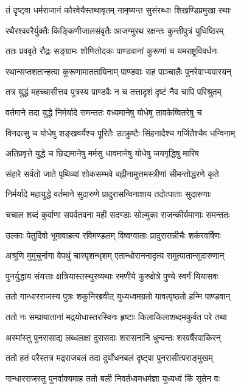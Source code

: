 \twolineshloka
{तं दृष्ट्वा धर्मराजानं कौरवेयैस्तथावृतम्}
{नामृष्यन्त सुसंरब्धाः शिखण्डिप्रमुखा रथाः}


\twolineshloka
{रथैरश्ववरैर्युक्तैः किङ्किणीजालसंवृतैः}
{आजग्मुरथ रक्षन्तः कुन्तीपुत्रं युधिष्ठिरम्}


\twolineshloka
{ततः प्रववृते रौद्रः सङ्ग्रामः शोणितोदकः}
{पाण्डवानां कुरूणां च यमराष्ट्रविवर्धनः}


\twolineshloka
{रथान्सप्तशतान्हत्वा कुरूणामाततायिनाम्}
{पाण्डवाः सह पाञ्चालैः पुनरेवाभ्यवारयन्}


\twolineshloka
{तत्र युद्धं महच्चासीत्तव पुत्रस्य पाण्डवैः}
{न च तत्तादृशं दृष्टं नैव चापि परिश्रुतम्}


\twolineshloka
{वर्तमाने तदा युद्धे निर्मर्यादे समन्ततः}
{वध्यमानेषु योधेषु तावकेष्वितरेषु च}


\twolineshloka
{विनदत्सु च योधेषु शङ्खवर्यैश्च पूरितैः}
{उत्क्रुष्टैः सिंहनादैश्च गर्जितैश्चैव धन्विनाम्}


\twolineshloka
{अतिप्रवृत्ते युद्धे च छिद्यमानेषु मर्मसु}
{धावमानेषु योधेषु जयगृद्धिषु मारिष}


\twolineshloka
{संहारे सर्वतो जाते पृथिव्यां शोकसम्भवे}
{वह्नीनामुत्तमस्त्रीणां सीमन्तोद्धरणे कृते}


\twolineshloka
{निर्मर्यादे महायुद्धे वर्तमाने सुदारुणे}
{प्रादुरासन्विनाशाय तदोत्पाताः सुदारुणाः}


\twolineshloka
{चचाल शब्दं कुर्वाणा सपर्वतवना मही}
{सदण्डाः सोल्मुका राजन्कीर्यमाणाः समन्ततः}


\twolineshloka
{उल्काः पेतुर्दिवो भूमावाहत्य रविमण्डलम्}
{विष्वग्वाताः प्रादुरासन्नीचैः शर्करवर्षिणः}


\twolineshloka
{अश्रूणि मुमुचुर्नागा वेपथुं चास्पृशन्भृशम्}
{एतान्धोराननादृत्य समुत्पातान्सुदारुणान्}


\twolineshloka
{पुनर्युद्धाय संयत्ताः क्षत्रियास्तस्थुरव्यथाः}
{रमणीये कुरुक्षेत्रे पुण्ये स्वर्गं यियासवः}


\twolineshloka
{ततो गान्धारराजस्य पुत्रः शकुनिरब्रवीत्}
{युध्यध्वमग्रतो यावत्पृष्ठतो हन्मि पाण्डवान्}


\twolineshloka
{ततो नः सम्प्रायातानां मद्रयोधास्तरस्विनः}
{हृष्टाः किलाकिलाशब्दमकुर्वत परे तथा}


\twolineshloka
{अस्मांस्तु पुनरासाद्य लब्धलक्षा दुरासदाः}
{शरासनानि धुन्वन्तः शरवर्षैरवाकिरन्}


\twolineshloka
{ततो हतं परैस्तत्र मद्रराजबलं तदा}
{दुर्योधनबलं दृष्ट्वा पुनरासीत्पराङ्मुखम्}


\twolineshloka
{गान्धारराजस्तु पुनर्वाक्यमाह ततो बली}
{निवर्तध्वमधर्मज्ञा युध्यध्वं किं सृतेन वः}


